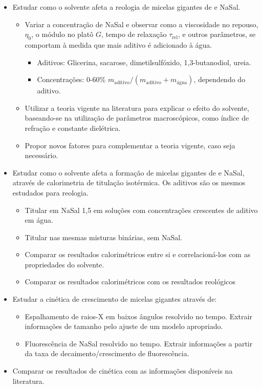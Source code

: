 		\begin{itemize}[noitemsep]
			\item Estudar como o solvente afeta a reologia de micelas gigantes de \CTAB{} e NaSal.
			\begin{itemize}[noitemsep]
				\item Variar a concentração de NaSal e observar como a viscosidade no repouso, \(\eta_0\), o módulo no platô \(G\), tempo de relaxação \(\tau_{\mathrm{rel}}\), e outros parâmetros, se comportam à medida que mais aditivo é adicionado à água.
				\begin{itemize}[noitemsep]
					\item Aditivos: Glicerina, sacarose, dimetilsulfóxido, 1,3-butanodiol, ureia.
					\item Concentrações: 0-60\% \(m_{\mathrm{aditivo}}/\left(m_{\mathrm{aditivo}}+m_{\mathrm{água}}\right)\), dependendo do aditivo.
				\end{itemize}
				\item Utilizar a teoria vigente na literatura para explicar o efeito do solvente, baseando-se na utilização de parâmetros macroscópicos, como índice de refração e constante dielétrica.
				\item Propor novos fatores para complementar a teoria vigente, caso seja necessário.
			\end{itemize}
			\item Estudar como o solvente afeta a formação de micelas gigantes de \TTAB{} e NaSal, através de calorimetria de titulação isotérmica. Os aditivos são os mesmos estudados para reologia.
			\begin{itemize}[noitemsep]
				\item Titular \TTAB{} em NaSal 1,5\mM{} em soluções com concentrações crescentes de aditivo em água.
				\item Titular \TTAB{} nas mesmas misturas binárias, sem NaSal.
				\item Comparar os resultados calorimétricos entre si e correlacioná-los com as propriedades do solvente.
				\item Comparar os resultados calorimétricos com os resultados reológicos
			\end{itemize}
			\item Estudar a cinética de crescimento de micelas gigantes através de:
			\begin{itemize}[noitemsep]
				\item Espalhamento de raios-X em baixos ângulos resolvido no tempo. Extrair informações de tamanho pelo ajuste de um modelo apropriado.
				\item Fluorescência de NaSal resolvido no tempo. Extrair informações a partir da taxa de decaimento/crescimento de fluorescência.
			\end{itemize}
			\item Comparar os resultados de cinética com as informações disponíveis na literatura.
		\end{itemize}
		